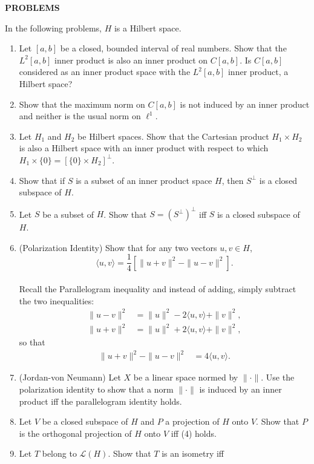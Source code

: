 \begin{center}
	\textbf{PROBLEMS}
\end{center}
In the following problems, $H$ is a Hilbert space.
\begin{enumerate}
	\setcounter{enumi}{0}
    \item Let $[a,b]$ be a closed, bounded interval of real numbers. Show that the $L^2[a,b]$ inner product is also an inner product on $C[a,b]$. Is $C[a,b]$ considered as an inner product space with the $L^2[a,b]$ inner product, a Hilbert space?
    \item Show that the maximum norm on $C[a,b]$ is not induced by an inner product and neither is the usual norm on $\ell^1$.
    \item Let $H_1$ and $H_2$ be Hilbert spaces. Show that the Cartesian product $H_1\times H_2$ is also a Hilbert space with an inner product with respect to which $H_1\times\{0\}=[\{0\}\times H_2]^\perp$.
    \item Show that if $S$ is a subset of an inner product space $H$, then $S^\perp$ is a closed subspace of $H$.
    \item Let $S$ be a subset of $H$. Show that $S=(S^\perp)^\perp$ iff $S$ is a closed subspace of $H$.
    \item (Polarization Identity) Show that for any two vectors $u,v\in H$,
    \[
        \langle u,v \rangle = \frac{1}{4}[\|u+v\|^2-\|u-v\|^2].
    \]
    \\Recall the Parallelogram inequality and instead of adding, simply subtract the two inequalities:
    \begin{align*}
        \|u-v\|^2&=\|u\|^2-2\langle u,v\rangle+\|v\|^2,\\
        \|u+v\|^2&=\|u\|^2+2\langle u,v\rangle+\|v\|^2,
    \end{align*}
    so that
    \begin{align*}
        \|u+v\|^2-\|u-v\|^2&=4\langle u,v\rangle.
    \end{align*}
    \item (Jordan-von Neumann) Let $X$ be a linear space normed by $\|\cdot\|$. Use the polarization identity to show that a norm $\|\cdot\|$ is induced by an inner product iff the parallelogram identity holds.
    \item Let $V$ be a closed subspace of $H$ and $P$ a projection of $H$ onto $V$. Show that $P$ is the orthogonal projection of $H$ onto $V$ iff (4) holds.
    \item Let $T$ belong to $\mathcal{L}(H)$. Show that $T$ is an isometry iff

\end{enumerate}
